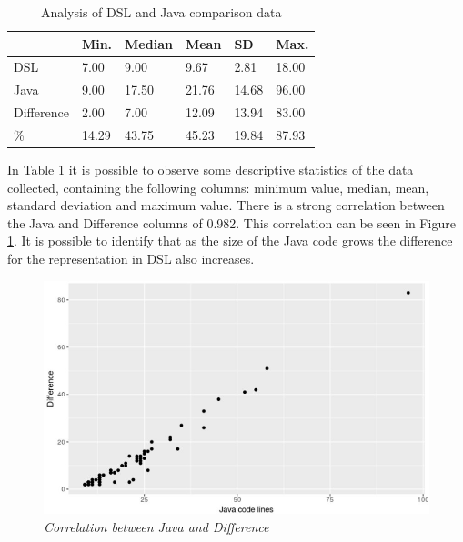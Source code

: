 \begin{table}[htb!]
\centering
\caption{Analysis of DSL and Java comparison data}
\label{table:analiseComparacao}
\begin{center}
\begin{tabular}{llllll}
\toprule
           & \textbf{Min.}  & \textbf{Median} & \textbf{Mean}  & \textbf{SD}    & \textbf{Max.}  \\ \midrule
DSL        & 7.00  & 9.00   & 9.67  & 2.81  & 18.00 \\ %
Java       & 9.00  & 17.50  & 21.76 & 14.68 & 96.00 \\ %
Difference & 2.00  & 7.00   & 12.09 & 13.94 & 83.00 \\ %
\%         & 14.29 & 43.75  & 45.23 & 19.84 & 87.93 \\ \bottomrule
\end{tabular}
\end{center}
\end{table}


In Table \ref{table:analiseComparacao} it is possible to observe some descriptive statistics of the data collected, containing the following columns: minimum value, median, mean, standard deviation and maximum value. There is a strong correlation between the Java and Difference columns of 0.982. This correlation can be seen in Figure \ref{fig:correlacao}. It is possible to identify that as the size of the Java code grows the difference for the representation in DSL also increases.

\begin{figure}[htb!] 
\centering
  \includegraphics[width=.45\textwidth]
  {img/artigo_correlacao.jpg}
  \caption{\it Correlation between Java and Difference}
  \label{fig:correlacao}
\end{figure}

